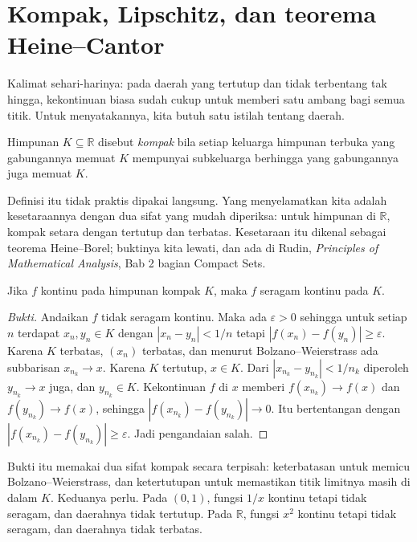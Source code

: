 \section{Kompak, Lipschitz, dan teorema Heine--Cantor}

Kalimat sehari-harinya: pada daerah yang tertutup dan tidak terbentang tak hingga,
kekontinuan biasa sudah cukup untuk memberi satu ambang bagi semua titik. Untuk
menyatakannya, kita butuh satu istilah tentang daerah.


\begin{definisi}[Kompak]
Himpunan $K\subseteq\mathbb{R}$ disebut \emph{kompak} bila setiap keluarga himpunan
terbuka yang gabungannya memuat $K$ mempunyai subkeluarga berhingga yang gabungannya
juga memuat $K$.
\end{definisi}

Definisi itu tidak praktis dipakai langsung. Yang menyelamatkan kita adalah
kesetaraannya dengan dua sifat yang mudah diperiksa: untuk himpunan di
$\mathbb{R}$, kompak setara dengan tertutup dan terbatas. Kesetaraan itu dikenal
sebagai teorema Heine--Borel; buktinya kita lewati, dan ada di Rudin,
\emph{Principles of Mathematical Analysis}, Bab 2 bagian Compact Sets.

\begin{teorema}
Jika $f$ kontinu pada himpunan kompak $K$, maka $f$ seragam kontinu pada $K$.
\end{teorema}

\begin{proof}[Bukti]
Andaikan $f$ tidak seragam kontinu. Maka ada $\varepsilon>0$ sehingga untuk setiap $n$
terdapat $x_{n},y_{n}\in K$ dengan $|x_{n}-y_{n}|<1/n$ tetapi
$|f(x_{n})-f(y_{n})|\ge\varepsilon$. Karena $K$ terbatas, $(x_{n})$ terbatas, dan
menurut Bolzano--Weierstrass ada subbarisan $x_{n_{k}}\to x$. Karena $K$ tertutup,
$x\in K$. Dari $|x_{n_{k}}-y_{n_{k}}|<1/n_{k}$ diperoleh $y_{n_{k}}\to x$ juga, dan
$y_{n_{k}}\in K$. Kekontinuan $f$ di $x$ memberi $f(x_{n_{k}})\to f(x)$ dan
$f(y_{n_{k}})\to f(x)$, sehingga $|f(x_{n_{k}})-f(y_{n_{k}})|\to 0$. Itu bertentangan
dengan $|f(x_{n_{k}})-f(y_{n_{k}})|\ge\varepsilon$. Jadi pengandaian salah.
\end{proof}

Bukti itu memakai dua sifat kompak secara terpisah: keterbatasan untuk memicu
Bolzano--Weierstrass, dan ketertutupan untuk memastikan titik limitnya masih di dalam
$K$. Keduanya perlu. Pada $(0,1)$, fungsi $1/x$ kontinu tetapi tidak seragam, dan
daerahnya tidak tertutup. Pada $\mathbb{R}$, fungsi $x^{2}$ kontinu tetapi tidak
seragam, dan daerahnya tidak terbatas.

